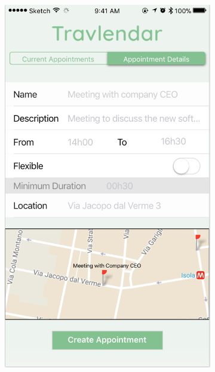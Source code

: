 \documentclass[12pt]{article}
\begin{document}
\begin{figure}[H]
\centering
    \begin{subfigure}{.4\textwidth}
        \includegraphics[scale=0.44]{interfaceNewAppointment.png}
        \label{fig:appointmentScreen}
    \end{subfigure}%
    \begin{subfigure}{.4\textwidth}

\end{subfigure}
\end{figure}
\end{document}
